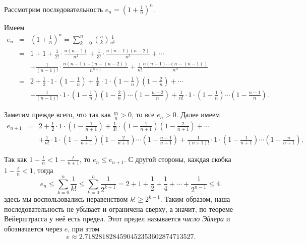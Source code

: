 \begin{example}
    Рассмотрим последовательность $e_n =\left(1 + \frac{1}{n} \right)^n$.
    
    Имеем
    \begin{eqnarray*}
        e_n &=& \left(1 + \frac{1}{n} \right)^n = \sum_{k=0}^n \binom{n}{k} \frac{1}{n^k}\\
        &=& 1 + 1 + \frac{1}{2!} \cdot \frac{n(n-1)}{n^2} + \frac{1}{3!}\cdot \frac{n(n-1)(n-2)}{n^3} + \cdots \\
        && + \frac{1}{(n-1)!} \cdot \frac{n(n-1)\cdots (n-(n-2))}{n^{n-1}} + \frac{1}{n!} \frac{n(n-1)\cdots (n-(n-1))}{n^n} \\
        &=& 2 + \frac{1}{2} \cdot 1\cdot \left(1-\frac{1}{n} \right) + \frac{1}{3!} \cdot 1 \cdot \left(1 - \frac{1}{n} \right) \left(1 - \frac{2}{n} \right)  + \cdots \\
        && + \frac{1}{(n-1)!} \cdot 1 \cdot \left(1 - \frac{1}{n} \right) \left(1 - \frac{2}{n} \right) \cdots \left(1 - \frac{n-2}{n} \right) + \frac{1}{n!} \cdot 1 \cdot \left(1 - \frac{1}{n} \right) \cdots \left(1 - \frac{n-1}{n} \right).
    \end{eqnarray*}

Заметим прежде всего, что так как $\frac{m}{n} >0$, то все $e_n >0$. Далее имеем
\begin{eqnarray*}
     e_{n+1} &=& 2 + \frac{1}{2}\cdot 1 \cdot\left(1 - \frac{1}{n+1} \right) + \frac{1}{3!} \cdot \left(1 - \frac{1}{n+1} \right)\left(1 - \frac{2}{n+1} \right) + \cdots \\
 && + \frac{1}{n!} \cdot 1 \cdot \left(1 - \frac{1}{n+1} \right) \left(1 - \frac{2}{n+1} \right) \cdots \left(1 - \frac{n-1}{n+1} \right) + \frac{1}{(n+1)!} \cdot 1 \cdot \left(1 - \frac{1}{n+1} \right) \cdots \left(1 - \frac{n}{n+1} \right).
\end{eqnarray*}

Так как $1 - \frac{t}{n} < 1 - \frac{t}{n+1}$, то $e_n \le e_{n+1}$. С другой стороны, каждая скобка $1- \frac{t}{n} <1$, тогда
\[
e_n \le \sum_{k=0}^n \frac{1}{k!} \le \sum_{k=0}^n \frac{1}{2^{k-1}} = 2 + 1 + \frac{1}{2} + \frac{1}{4} + \cdots + \frac{1}{2^{n-1}} \le 4.
\]
здесь мы воспользовались неравенством $k! \ge 2^{k-1}$. Таким образом, наша последовательность не убывает и ограничена сверху, а значит, по теореме Вейерштрасса у неё есть предел. Этот предел называется \textit{число Эйлера} и обозначается через $e$, при этом 
$$e \approx 2.7182818284590452353602874713527.$$

\end{example}



